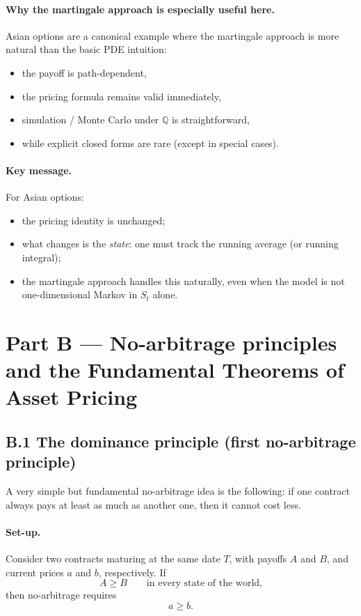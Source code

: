 \documentclass[11pt]{article}
\newcommand{\Qbb}{\mathbb{Q}}
\newcommand{\1}{\mathbf{1}}
\begin{document}
\paragraph{Why the martingale approach is especially useful here.}
Asian options are a canonical example where the martingale approach is more natural than the basic PDE intuition:
\begin{itemize}[leftmargin=1.4em]
    \item the payoff is path-dependent,
    \item the pricing formula remains valid immediately,
    \item simulation / Monte Carlo under \(\Qbb\) is straightforward,
    \item while explicit closed forms are rare (except in special cases).
\end{itemize}

\paragraph{Key message.}
For Asian options:
\begin{itemize}[leftmargin=1.4em]
    \item the pricing identity is unchanged;
    \item what changes is the \emph{state}: one must track the running average (or running integral);
    \item the martingale approach handles this naturally, even when the model is not one-dimensional Markov in \(S_t\) alone.
\end{itemize}

\section*{Part B --- No-arbitrage principles and the Fundamental Theorems of Asset Pricing}

\subsection*{B.1 The dominance principle (first no-arbitrage principle)}

A very simple but fundamental no-arbitrage idea is the following:
if one contract always pays at least as much as another one, then it cannot cost less.

\paragraph{Set-up.}
Consider two contracts maturing at the same date \(T\), with payoffs \(A\) and \(B\),
and current prices \(a\) and \(b\), respectively.
If
$$
A \ge B
\qquad \text{in every state of the world,}
$$
then no-arbitrage requires
$$
\boxed{\ a \ge b.\ }
$$
\end{document}
